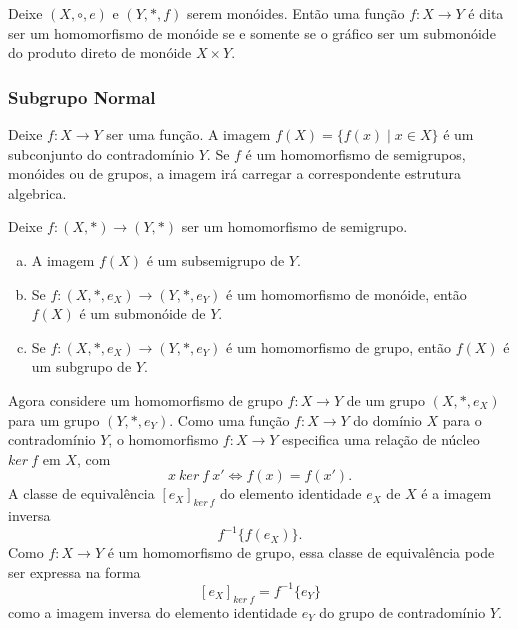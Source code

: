 \begin{corollary}
  Deixe $(X,\circ, e)$ e $(Y,*,f)$ serem monóides. Então uma função $f: X \to Y$ é dita ser um homomorfismo de monóide se e somente se o gráfico ser um submonóide do produto direto de monóide $X\times Y$.
\end{corollary}

\subsubsection{Subgrupo Normal}
Deixe $f: X\to Y$ ser uma função. A imagem $f(X) = \{f(x) \mid x \in X\}$ é um subconjunto do contradomínio $Y$.
Se $f$ é um homomorfismo de semigrupos, monóides ou de grupos, a imagem irá carregar a correspondente estrutura algebrica.

\begin{stat}
  Deixe $f: (X,*) \to (Y,*)$ ser um homomorfismo de semigrupo.
  \begin{enumerate}[(a)]
    \item A imagem $f(X)$ é um subsemigrupo de $Y$.
    \item Se $f: (X,*,e_{X}) \to (Y,*,e_{Y})$ é um homomorfismo de monóide, então $f(X)$ é um submonóide de $Y$.
    \item Se $f: (X,*,e_{X}) \to (Y,*,e_{Y})$ é um homomorfismo de grupo, então $f(X)$ é um subgrupo de $Y$.
  \end{enumerate}
\end{stat}
Agora considere um homomorfismo de grupo $f:X\to Y$ de um grupo $(X,*,e_{X})$ para um grupo $(Y,*,e_{Y})$. Como uma função $f: X\to Y$ do domínio $X$ para o contradomínio $Y$, o homomorfismo $f: X\to Y$ especifica uma relação de núcleo $ker\ f$ em $X$, com
$$ x\ ker\ f\ x' \Leftrightarrow f(x)=f(x').$$
A classe de equivalência $[e_{X}]_{ker\ f}$ do elemento identidade $e_{X}$ de $X$ é a imagem inversa $$f^{-1}\{f(e_{X})\}.$$
Como $f: X\to Y$ é um homomorfismo de grupo, essa classe de equivalência pode ser expressa na forma $$[e_{X}]_{ker\ f}=f^{-1}\{e_{Y}\}$$ como a imagem inversa do elemento identidade $e_{Y}$ do grupo de contradomínio $Y$.

